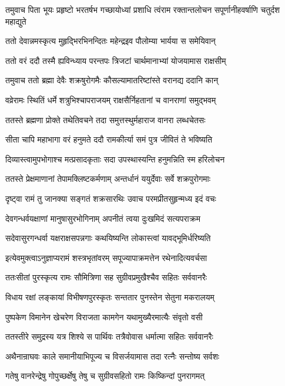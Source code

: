 \threelineshloka
{तमुवाच पिता भूयः प्रहृष्टो भरतर्षभ}
{गच्छायोध्यां प्रशाधि त्वंराम रक्तान्तलोचन}
{सपूर्णानीहवर्षाणि चतुर्दश महाद्युते}


\twolineshloka
{ततो देवान्नमस्कृत्य मुहृद्भिरभिनन्दितः}
{महेन्द्रइव पौलोम्या भार्यया स समेयिवान्}


\twolineshloka
{ततो वरं ददौ तस्मै ह्यविन्ध्याय परन्तपः}
{त्रिजटां चार्थमानाभ्यां योजयामास राक्षसीम्}


\twolineshloka
{तमुवाच ततो ब्रह्मा देवैः शक्रषुरोगमैः}
{कौसल्यामातरिष्टांस्ते वरानद्य ददानि कान्}


\twolineshloka
{वव्रेरामः स्थितिं धर्मे शत्रुभिश्चापराजयम्}
{राक्षसैर्निहतानां च वानराणां समुद्भवम्}


\twolineshloka
{ततस्ते ब्रह्मणा प्रोक्ते तथेतिवचने तदा}
{समुत्तस्थुर्महाराज वानरा लब्धचेतसः}


\twolineshloka
{सीता चापि महाभागा वरं हनुमते ददौ}
{रामकीर्त्या समं पुत्र जीवितं ते भविष्यति}


\twolineshloka
{दिव्यास्त्वामुपभोगाश्च मत्प्रसादकृताः सदा}
{उपस्थास्यन्ति हनुमन्निति स्म हरिलोचन}


\twolineshloka
{ततस्ते प्रेक्षमाणानां तेपामक्लिष्टकर्मणाम्}
{अन्तर्धानं ययुर्देवाः सर्वे शक्रपुरोगमाः}


\twolineshloka
{दृष्ट्वा रामं तु जानक्या सङ्गतं शक्रसारथिः}
{उवाच परमप्रीतसुहृन्मध्य इदं वचः}


\twolineshloka
{देवगन्धर्वयक्षाणां मानुषासुरभोगिनाम्}
{अपनीतं त्वया दुःखमिदं सत्यपराक्रम}


\twolineshloka
{सदेवासुरगन्धर्वा यक्षराक्षसपन्नगाः}
{कथयिष्यन्ति लोकास्त्वां यावद्भूमिर्धरिष्यति}


\twolineshloka
{इत्येवमुक्त्वाऽनुज्ञाप्यरामं शस्त्रभृतांवरम्}
{सपूज्यापाक्रमत्तेन रथेनादित्यवर्चसा}


\twolineshloka
{ततःसीतां पुरस्कृत्य रामः सौमित्रिणा सह}
{सुग्रीवप्रमुखैश्चैव सहितः सर्ववानरैः}


\twolineshloka
{विधाय रक्षां लङ्कायां विभीषणपुरस्कृतः}
{सन्ततार पुनस्तेन सेतुना मकरालयम्}


\twolineshloka
{पुष्पकेण विमानेन खेचरेण विराजता}
{कामगेन यथामुख्यैरमात्यैः संवृतो वसी}


\twolineshloka
{ततस्तीरे समुद्रस्य यत्र शिश्ये स पार्थिवः}
{तत्रैवोवास धर्मात्मा सहितः सर्ववानरैः}


\twolineshloka
{अथैनान्राघवः काले समानीयाभिपूज्य च}
{विसर्जयामास तदा रत्नैः सन्तोष्य सर्वशः}


\twolineshloka
{गतेषु वानरेन्द्रेषु गोपुच्छर्क्षेषु तेषु च}
{सुग्रीवसहितो रामः किष्किन्दां पुनरागमत्}


